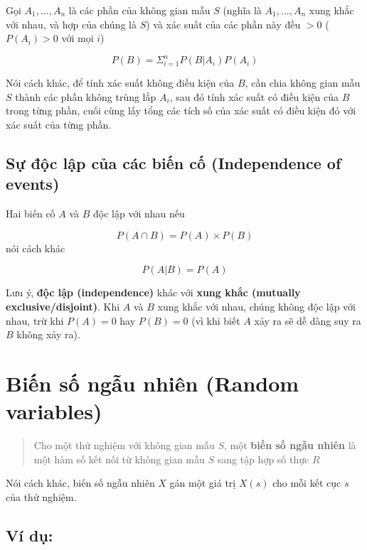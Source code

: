 \documentclass[
]{book}
\begin{document}
Gọi \(A_1,\ldots,A_n\) là các phần của không gian mẫu \(S\) (nghĩa là \(A_1,\ldots,A_n\) xung khắc với nhau, và hợp của chúng là \(S\)) và xác suất của các phần này đều \(>0\) (\(P(A_i) > 0\) với mọi \(i\))

\[
P(B) = \Sigma^n_{i = 1}P(B|A_i)P(A_i)
\]

Nói cách khác, để tính xác suất không điều kiện của \(B\), cần chia không gian mẫu \(S\) thành các phần không trùng lắp \(A_i\), sau đó tính xác suất có điều kiện của \(B\) trong từng phần, cuối cùng lấy tổng các tích số của xác suất có điều kiện đó với xác suất của từng phần.

\hypertarget{sux1ef1-ux111ux1ed9c-lux1eadp-cux1ee7a-cuxe1c-biux1ebfn-cux1ed1-independence-of-events}{%
\subsection{Sự độc lập của các biến cố (Independence of events)}\label{sux1ef1-ux111ux1ed9c-lux1eadp-cux1ee7a-cuxe1c-biux1ebfn-cux1ed1-independence-of-events}}

Hai biến cố \(A\) và \(B\) độc lập với nhau nếu

\[
P(A \cap B) = P(A) \times P(B)
\]
nói cách khác

\[
P(A|B) = P(A)
\]

Lưu ý, \textbf{độc lập (independence)} khác với \textbf{xung khắc (mutually exclusive/disjoint)}. Khi \(A\) và \(B\) xung khắc với nhau, chúng không độc lập với nhau, trừ khi \(P(A) = 0\) hay \(P(B) = 0\) (vì khi biết \(A\) xảy ra sẽ dễ dàng suy ra \(B\) không xảy ra).

\hypertarget{biux1ebfn-sux1ed1-ngux1eabu-nhiuxean-random-variables}{%
\section{Biến số ngẫu nhiên (Random variables)}\label{biux1ebfn-sux1ed1-ngux1eabu-nhiuxean-random-variables}}

\begin{quote}
Cho một thử nghiệm với không gian mẫu \(S\), một \textbf{biến số ngẫu nhiên} là một hàm số kết nối từ không gian mẫu \(S\) sang tập hợp số thực \(R\)
\end{quote}

Nói cách khác, biến số ngẫu nhiên \(X\) gán một giá trị \(X(s)\) cho mỗi kết cục \(s\) của thử nghiệm.

\hypertarget{vuxed-dux1ee5}{%
\subsection{Ví dụ:}\label{vuxed-dux1ee5}}
\end{document}
